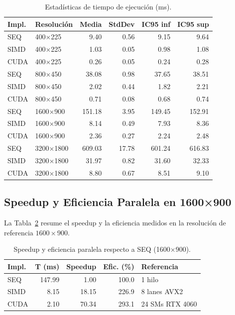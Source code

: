 \documentclass[conference]{IEEEtran}
\begin{document}
\begin{table}[H]
\centering
\caption{Estadísticas de tiempo de ejecución (ms).}
\label{tab:stats}
\setlength{\tabcolsep}{4pt}
\begin{tabular}{llrrrr}
\toprule
\textbf{Impl.} & \textbf{Resolución} & \textbf{Media} & \textbf{StdDev} & \textbf{IC95 inf} & \textbf{IC95 sup} \\
\midrule
\rowcolor{rowA} SEQ  & 400×225   &   9.40 & 0.56 &   9.15 &   9.64 \\
\rowcolor{rowB} SIMD & 400×225   &   1.03 & 0.05 &   0.98 &   1.08 \\
\rowcolor{rowC} CUDA & 400×225   &   0.26 & 0.05 &   0.24 &   0.28 \\
\midrule
\rowcolor{rowA} SEQ  & 800×450   &  38.08 & 0.98 &  37.65 &  38.51 \\
\rowcolor{rowB} SIMD & 800×450   &   2.02 & 0.44 &   1.82 &   2.21 \\
\rowcolor{rowC} CUDA & 800×450   &   0.71 & 0.08 &   0.68 &   0.74 \\
\midrule
\rowcolor{rowA} SEQ  & 1600×900  & 151.18 & 3.95 & 149.45 & 152.91 \\
\rowcolor{rowB} SIMD & 1600×900  &   8.14 & 0.49 &   7.93 &   8.36 \\
\rowcolor{rowC} CUDA & 1600×900  &   2.36 & 0.27 &   2.24 &   2.48 \\
\midrule
\rowcolor{rowA} SEQ  & 3200×1800 & 609.03 &17.78 & 601.24 & 616.83 \\
\rowcolor{rowB} SIMD & 3200×1800 &  31.97 & 0.82 &  31.60 &  32.33 \\
\rowcolor{rowC} CUDA & 3200×1800 &   8.80 & 0.67 &   8.51 &   9.10 \\
\bottomrule
\end{tabular}
\end{table}

\subsection{Speedup y Eficiencia Paralela en 1600×900}

La Tabla~\ref{tab:speedup} resume el speedup y la eficiencia medidos en la resolución
de referencia $1600\!\times\!900$.

\begin{table}[H]
\centering
\caption{Speedup y eficiencia paralela respecto a SEQ (1600×900).}
\label{tab:speedup}
\begin{tabular}{lrrrl}
\toprule
\textbf{Impl.} & \textbf{T (ms)} & \textbf{Speedup} & \textbf{Efic. (\%)} & \textbf{Referencia} \\
\midrule
SEQ  & 147.99 &  1.00 & 100.0 & 1 hilo \\
SIMD &   8.15 & 18.15 & 226.9 & 8 lanes AVX2 \\
CUDA &   2.10 & 70.34 & 293.1 & 24 SMs RTX 4060 \\
\bottomrule
\end{tabular}
\end{table}
\end{document}
